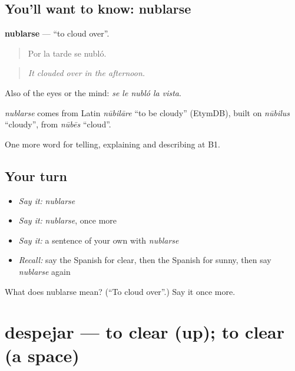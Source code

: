 \subsection*{You'll want to know: nublarse}
\textbf{nublarse} — \textquotedblleft{}to cloud over\textquotedblright{}.

\begin{quote}
Por la tarde se nubló.
\end{quote}

\begin{quote}
\emph{It clouded over in the afternoon.}
\end{quote}

Also of the eyes or the mind: \emph{se le nubló la vista}.

\begin{cousinweb}
\emph{nublarse} comes from Latin \emph{nūbilāre} \textquotedblleft{}to be cloudy\textquotedblright{} (EtymDB), built on \emph{nūbilus} \textquotedblleft{}cloudy\textquotedblright{}, from \emph{nūbēs} \textquotedblleft{}cloud\textquotedblright{}.
\end{cousinweb}

\begin{grammarlens}[title={What you've built}]
One more word for telling, explaining and describing at B1.
\end{grammarlens}

\subsection*{Your turn}
\begin{itemize}
\raggedright
  \item \emph{Say it:} \emph{nublarse}
  \item \emph{Say it:} \emph{nublarse}, once more
  \item \emph{Say it:} a sentence of your own with \emph{nublarse}
  \item \emph{Recall:} say the Spanish for clear, then the Spanish for sunny, then say \emph{nublarse} again
\end{itemize}

\begin{tcolorbox}[breakable,colback=teal!4,colframe=teal!35!black,title={Before you move on}]
What does nublarse mean? (\textquotedblleft{}To cloud over\textquotedblright{}.) Say it once more.
\end{tcolorbox}
\section[despejar]{despejar — to clear (up); to clear (a space)}

